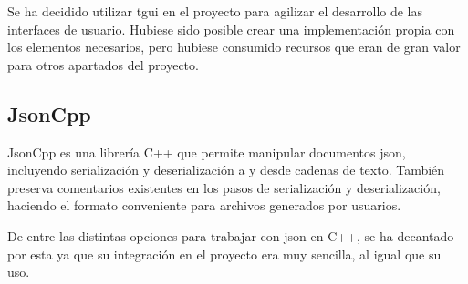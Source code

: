 		\FloatBarrier

		Se ha decidido utilizar \acrshort{tgui} en el proyecto para agilizar el desarrollo de las interfaces de usuario. Hubiese sido posible crear una implementación propia con los elementos necesarios, pero hubiese consumido recursos que eran de gran valor para otros apartados del proyecto.

	\subsection{JsonCpp}

		JsonCpp es una librería C++ que permite manipular documentos \acrshort{json}, incluyendo serialización y deserialización a y desde cadenas de texto. También preserva comentarios existentes en los pasos de serialización y deserialización, haciendo el formato conveniente para archivos generados por usuarios.

		De entre las distintas opciones para trabajar con \acrshort{json} en C++, se ha decantado por esta ya que su integración en el proyecto era muy sencilla, al igual que su uso.
